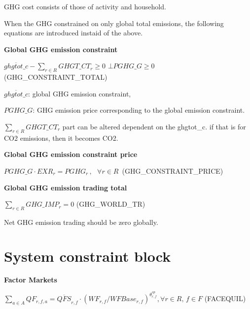 \documentclass[10pt,a4paper,titlepage,dvipdfmx]{book}
\begin{document}
GHG cost consists of those of activity and household.

When the GHG constrained on only global total emissions, the following equations are introduced instaid of the above.

\begin{flushleft}\textbf{Global GHG emission constraint}\end{flushleft}


\begin{center}$\overline{ghgtot\_ c}-\sum _{r\in R}GHGT\_ CT_{r}\geq 0\,\,\bot PGHG\_ G\geq 0\,$               (GHG\_CONSTRAINT\_TOTAL)
\end{center}

\begin{flushleft}
$\overline{ghgtot\_ c}$: global GHG emission constraint,

$PGHG\_G$: GHG emission price corresponding to the global emission constraint.

$\sum _{r\in R}GHGT\_ CT_{r}$ part can be altered dependent on the ghgtot\_c. if that is for CO2 emissions, then it becomes CO2.
\end{flushleft}

\begin{flushleft}\textbf{Global GHG emission constraint price}\end{flushleft}


\begin{center}$PGHG\_ G\cdot EXR_{r}=PGHG_{r}\,,\,\,\,\,\forall r\in R\,$ (GHG\_CONSTRAINT\_PRICE)
\end{center}

\begin{flushleft}\textbf{Global GHG emission trading total}\end{flushleft}


\begin{center}$\sum _{r\in R}GHG\_ IMP_{r}=0$ (GHG\_WORLD\_TR)
\end{center}

Net GHG emission trading should be zero globally.

\section{\label{sec:SysConBlo}System constraint block\label{mark-4.10.}}

\begin{flushleft}\textbf{Factor Markets}\end{flushleft}


\begin{center}$\sum _{a\in A}QF_{r,f,a}=\overline{QFS}_{r,f}\cdot \left(WF_{r,f}/WFBase_{r,f}\right)^{\theta _{r,f}^{sp}},\forall r\in R,\,f\in F$ (FACEQUIL)
\end{center}
\end{document}
